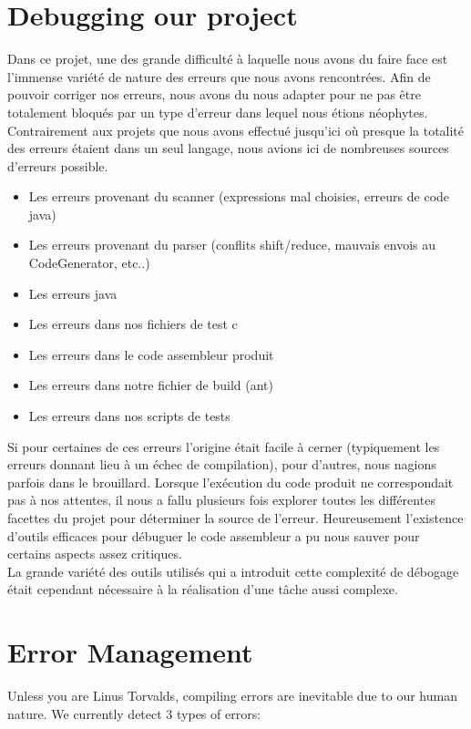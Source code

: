 \documentclass{article}
\begin{document}
\section{Debugging our project}
Dans ce projet, une des grande difficulté à laquelle nous avons du faire face est l'immense variété de nature des erreurs que nous avons rencontrées. Afin de pouvoir corriger nos erreurs, nous avons du nous adapter pour ne pas être totalement bloqués par un type d'erreur dans lequel nous étions néophytes.\\
Contrairement aux projets que nous avons effectué jusqu'ici où presque la totalité des erreurs étaient dans un seul langage, nous avions ici de nombreuses sources d'erreurs possible.\\
\begin{itemize}
\item Les erreurs provenant du scanner (expressions mal choisies, erreurs de code java)
\item Les erreurs provenant du parser (conflits shift/reduce, mauvais envois au CodeGenerator, etc..)
\item Les erreurs java
\item Les erreurs dans nos fichiers de test c
\item Les erreurs dans le code assembleur produit
\item Les erreurs dans notre fichier de build (ant)
\item Les erreurs dans nos scripts de tests
\end{itemize}
Si pour certaines de ces erreurs l'origine était facile à cerner (typiquement les erreurs donnant lieu à un échec de compilation), pour d'autres, nous nagions parfois dans le brouillard. Lorsque l'exécution du code produit ne correspondait pas à nos attentes, il nous a fallu plusieurs fois explorer toutes les différentes facettes du projet pour déterminer la source de l'erreur. Heureusement l'existence d'outils efficaces pour débuguer le code assembleur a pu nous sauver pour certains aspects assez critiques.\\
La grande variété des outils utilisés qui a introduit cette complexité de débogage était cependant nécessaire à la réalisation d'une tâche aussi complexe.

\section{Error Management}
Unless you are Linus Torvalds, compiling errors are inevitable due to our human nature. We currently detect 3 types of errors:
\end{document}
